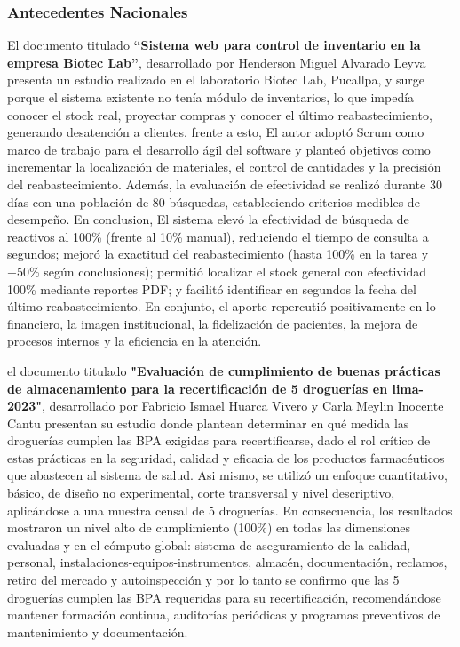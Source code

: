\documentclass[12pt]{article} %
\begin{document}
\subsubsection{Antecedentes Nacionales}

El documento titulado \textbf{“Sistema web para control de inventario en la empresa Biotec Lab”}, desarrollado por Henderson Miguel Alvarado Leyva presenta un estudio realizado en el laboratorio Biotec Lab, Pucallpa, y surge porque el sistema existente no tenía módulo de inventarios, lo que impedía conocer el stock real, proyectar compras y conocer el último reabastecimiento, generando desatención a clientes. frente a esto, El autor adoptó Scrum como marco de trabajo para el desarrollo ágil del software y planteó objetivos como incrementar la localización de materiales, el control de cantidades y la precisión del reabastecimiento. Además, la evaluación de efectividad se realizó durante 30 días con una población de 80 búsquedas, estableciendo criterios medibles de desempeño. En conclusion, El sistema elevó la efectividad de búsqueda de reactivos al 100\% (frente al 10\% manual), reduciendo el tiempo de consulta a segundos; mejoró la exactitud del reabastecimiento (hasta 100\% en la tarea y +50\% según conclusiones); permitió localizar el stock general con efectividad 100\% mediante reportes PDF; y facilitó identificar en segundos la fecha del último reabastecimiento. En conjunto, el aporte repercutió positivamente en lo financiero, la imagen institucional, la fidelización de pacientes, la mejora de procesos internos y la eficiencia en la atención.

el documento titulado \textbf{\string"Evaluación de cumplimiento de buenas prácticas de almacenamiento para la recertificación de 5 droguerías en lima-2023"}, desarrollado por Fabricio Ismael Huarca Vivero y Carla Meylin Inocente Cantu presentan su estudio donde plantean determinar en qué medida las droguerías cumplen las BPA exigidas para recertificarse, dado el rol crítico de estas prácticas en la seguridad, calidad y eficacia de los productos farmacéuticos que abastecen al sistema de salud. Asi mismo, se utilizó un enfoque cuantitativo, básico, de diseño no experimental, corte transversal y nivel descriptivo, aplicándose a una muestra censal de 5 droguerías. En consecuencia, los resultados mostraron un nivel alto de cumplimiento (100\%) en todas las dimensiones evaluadas y en el cómputo global: sistema de aseguramiento de la calidad, personal, instalaciones-equipos-instrumentos, almacén, documentación, reclamos, retiro del mercado y autoinspección y por lo tanto se confirmo que las 5 droguerías cumplen las BPA requeridas para su recertificación, recomendándose mantener formación continua, auditorías periódicas y programas preventivos de mantenimiento y documentación.
\end{document}
